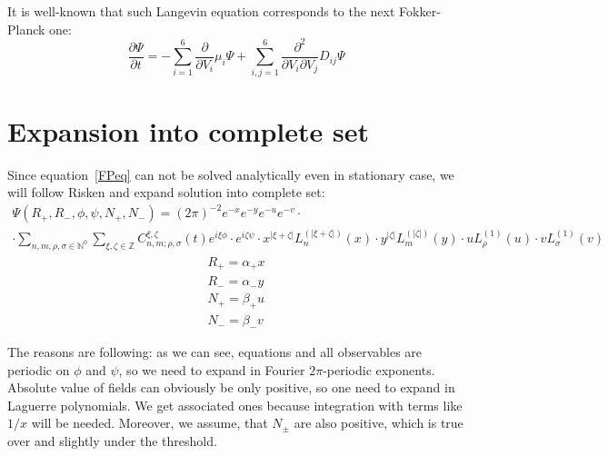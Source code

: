 \documentclass[12pt, notitlepage]{report}
\begin{document}
	It is well-known that such Langevin equation corresponds to the next Fokker-Planck one:
	\begin{equation}
		\label{FPeq}
		\frac{\partial \Psi}{\partial t} = -\sum\limits_{i=1}^6 \frac{\partial}{\partial V_i} \mu_i\Psi + \sum\limits_{i,j=1}^6 \frac{\partial^2}{\partial V_i\partial V_j}D_{ij}\Psi
	\end{equation}

	\section{Expansion into complete set}
Since equation~\eqref{FPeq} can not be solved analytically even in stationary case, we will follow Risken and expand solution into complete set:
\newcommand{\Lagg}[3]{L_{#1}^{(#2)}\!\!\left(#3\right)}
\begin{multline}
	\Psi(R_+, R_-, \phi, \psi, N_+, N_-) =(2\pi)^{-2} e^{-x}e^{-y}e^{-u}e^{-v} \cdot \\ \cdot \sum\limits_{n,m,\rho,\sigma\in \mathbb{N}^0}\sum\limits_{\xi,\zeta\in\mathbb{Z}} C^{\xi, \zeta}_{n,m; \rho, \sigma}(t) e^{i\xi \phi} \cdot e^{i\zeta \psi} \cdot  x^{|\xi+\zeta|}\Lagg{n}{|\xi+\zeta|}{x} \cdot y^{|\zeta|}\Lagg{m}{|\zeta|}{y} \cdot
	 u\Lagg{\rho}{1}{u} \cdot v\Lagg{\sigma}{1}{v}
\end{multline}
\begin{gather*}
	R_+ = \alpha_+ x\\
	R_- = \alpha_- y\\
	N_+ = \beta_+ u \\
	N_- = \beta_- v
\end{gather*}

The reasons are following: as we can see, equations and all observables are periodic on $\phi$ and $\psi$, so we need to expand in Fourier $2\pi$-periodic exponents. Absolute value of fields can obviously be only positive, so one need to expand in Laguerre polynomials. We get associated ones because integration with terms like $1/x$ will be needed. Moreover, we assume, that $N_\pm$ are also positive, which is true over and slightly under the threshold.
\end{document}
